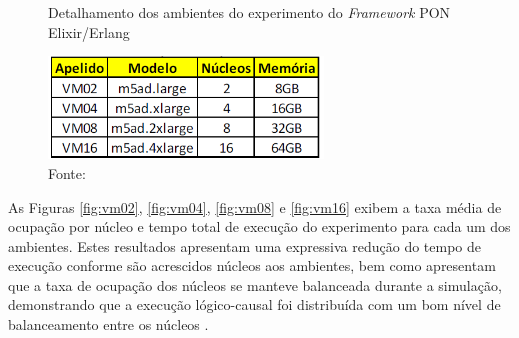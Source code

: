 \begin{figure}[!htb]
  \centering
  \caption{Detalhamento dos ambientes do experimento do \textit{Framework} PON
    Elixir/Erlang} \includegraphics[width=0.65\textwidth]{../figures/maquinas_elixir.png}
  \smallskip
  \caption*{Fonte: }
  \label{fig:ambientes_elixir}
\end{figure}

As Figuras \ref{fig:vm02}, \ref{fig:vm04}, \ref{fig:vm08} e \ref{fig:vm16}
exibem a taxa média de ocupação por núcleo e tempo total de execução do
experimento para cada um dos ambientes. Estes resultados apresentam uma
expressiva redução do tempo de execução conforme são acrescidos núcleos aos
ambientes, bem como apresentam que a taxa de ocupação dos núcleos se manteve
balanceada durante a simulação, demonstrando que a execução lógico-causal foi
distribuída com um bom nível de balanceamento entre os núcleos
\cite{msc_negrini_2019}.

